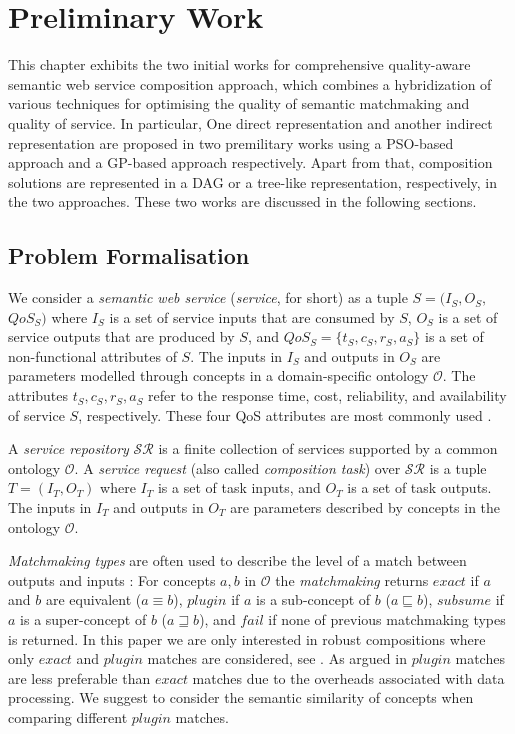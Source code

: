 \chapter{Preliminary Work}\label{C:preliminary}

This chapter exhibits the two initial works for comprehensive quality-aware semantic web service composition approach, which combines a hybridization of various techniques for optimising the quality of semantic matchmaking and quality of service. In particular,  One direct representation and another indirect representation are proposed in two premilitary works using a PSO-based approach and a GP-based approach respectively. Apart from that, composition solutions are represented in a DAG or a tree-like representation,  respectively, in the two approaches. These two works are discussed in the following sections.

\section{Problem Formalisation}\label{problemDes}

We consider a \emph{semantic web service} (\emph{service}, for short) as a tuple $S =(I_{S}, O_{S}, $ $QoS_S)$ where $I_{S}$ is a set of service inputs that are consumed by $S$, $O_{S}$ is a set of service outputs that are produced by $S$, and $QoS_{S}=\{t_S, c_S, r_S, a_S\}$ is a set of non-functional attributes of $S$. The inputs in $I_{S}$ and outputs in $O_{S}$ are parameters modelled through concepts in a domain-specific ontology $\mathcal{O}$. The attributes $t_S, c_S, r_S, a_S$ refer to the response time, cost, reliability, and availability of service $S$, respectively. These four QoS attributes are most commonly used \cite{zeng2003quality}.

A \emph{service repository} $\mathcal{SR}$ is a finite collection of services supported by a common ontology $\mathcal{O}$. A \emph{service request} (also called \emph{composition task}) over $\mathcal{SR}$ is a tuple $T=(I_{T}, O_{T})$ where $I_{T}$ is a set of task inputs, and $O_{T}$ is a set of task outputs. The inputs in $I_{T}$ and outputs in $O_{T}$ are parameters described by concepts in the ontology $\mathcal{O}$.

\emph{Matchmaking types} are often used to describe the level of a match between outputs and inputs \cite{paolucci2002semantic}: For concepts $a, b$ in $\mathcal{O}$ the \emph{matchmaking} returns $exact$ if $a$ and $b$ are equivalent ($a \equiv b$), $plugin$ if $a$ is a sub-concept of $b$ ($a \sqsubseteq b$), $subsume$ if $a$ is a super-concept of $b$ ($a \sqsupseteq b$), and $fail$ if none of previous matchmaking types is returned. In this paper we are only interested in robust compositions where only $exact$ and $plugin$ matches are considered, see \cite{lecue2009optimizing}. As argued in \cite{lecue2009optimizing} $plugin$ matches are less preferable than $exact$ matches due to the overheads associated with data processing. We suggest to consider the semantic similarity of concepts when comparing different $plugin$ matches.

